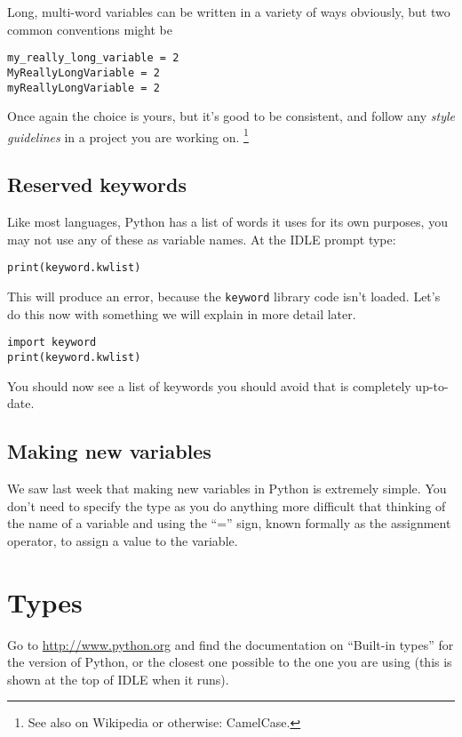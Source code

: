 \documentclass[12pt,oneside]{cttutorial}
\begin{document}
Long, multi-word variables can be written in a variety of ways obviously, but two common conventions might be

\begin{lstlisting}
my_really_long_variable = 2
MyReallyLongVariable = 2
myReallyLongVariable = 2
\end{lstlisting}

Once again the choice is yours, but it's good to be consistent, and follow any \emph{style guidelines} in a project you are working on. \footnote{See also on Wikipedia or otherwise: CamelCase.}

\subsection{Reserved keywords}

Like most languages, Python has a list of words it uses for its own purposes, you may not use any of these as variable names. At the IDLE prompt type:

\begin{lstlisting}
print(keyword.kwlist)
\end{lstlisting}

This will produce an error, because the \lstinline!keyword! library code isn't loaded. Let's do this now with something we will explain in more detail later.

\begin{lstlisting}
import keyword
print(keyword.kwlist)
\end{lstlisting}

You should now see a list of keywords you should avoid that is completely up-to-date.

\subsection{Making new variables}

We saw last week that making new variables in Python is extremely simple. You don't need to specify the type as you do anything more difficult that thinking of the name of a variable and using the ``='' sign, known formally as the assignment operator, to assign a value to the variable.

\section{Types}

Go to \url{http://www.python.org} and find the documentation on ``Built-in types'' for the version of Python, or the closest
one possible to the one you are using (this is shown at the top of IDLE when it runs).
\end{document}
